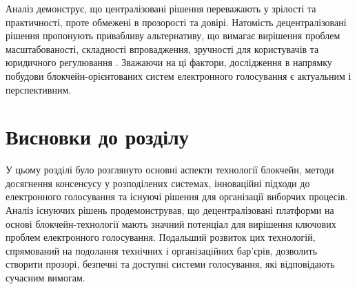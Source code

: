 \documentclass[14pt]{extreport}
\begin{document}
  \begin{table}[H]
    \caption{\\\centering\textbf{Порівняння централізованих та децентралізованих систем голосування}}
    \label{tab:voting_systems_comparison}
  \end{table}
  
  Аналіз демонструє, що централізовані рішення переважають у зрілості та практичності, проте обмежені в прозорості та довірі. Натомість децентралізовані рішення пропонують привабливу альтернативу, що вимагає вирішення проблем масштабованості, складності впровадження, зручності для користувачів та юридичного регулювання \cite{ieee:almeida}. Зважаючи на ці фактори, дослідження в напрямку побудови блокчейн-орієнтованих систем електронного голосування є актуальним і перспективним.
  
  \section{Висновки до розділу \thechapter}
  
  У цьому розділі було розглянуто основні аспекти технології блокчейн, методи досягнення консенсусу у розподілених системах, інноваційні підходи до електронного голосування та існуючі рішення для організації виборчих процесів. Аналіз існуючих рішень продемонстрував, що децентралізовані платформи на основі блокчейн-технології мають значний потенціал для вирішення ключових проблем електронного голосування. Подальший розвиток цих технологій, спрямований на подолання технічних і організаційних бар'єрів, дозволить створити прозорі, безпечні та доступні системи голосування, які відповідають сучасним вимогам.
  
\end{document}
